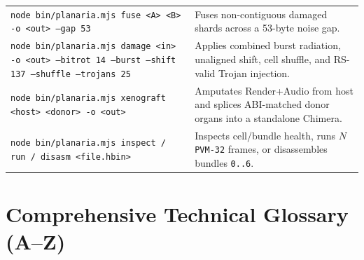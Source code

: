 \documentclass[10pt,letterpaper]{article}
\begin{document}
\begin{table}[ht]
\begin{tabularx}{\textwidth}{@{} L{6.8cm} Y @{}}
\texttt{node bin/planaria.mjs fuse <A> <B> -o <out> --gap 53} & Fuses non-contiguous damaged shards across a 53-byte noise gap. \\
\texttt{node bin/planaria.mjs damage <in> -o <out> --bitrot 14 --burst --shift 137 --shuffle --trojans 25} & Applies combined burst radiation, unaligned shift, cell shuffle, and RS-valid Trojan injection. \\
\texttt{node bin/planaria.mjs xenograft <host> <donor> -o <out>} & Amputates Render+Audio from host and splices ABI-matched donor organs into a standalone Chimera. \\
\texttt{node bin/planaria.mjs inspect / run / disasm <file.hbin>} & Inspects cell/bundle health, runs $N$ \texttt{PVM-32} frames, or disassembles bundles \texttt{0..6}. \\
\bottomrule
\end{tabularx}
\end{table}

\FloatBarrier
\section{Comprehensive Technical Glossary (A--Z)}
\label{sec:glossary}
\end{document}
